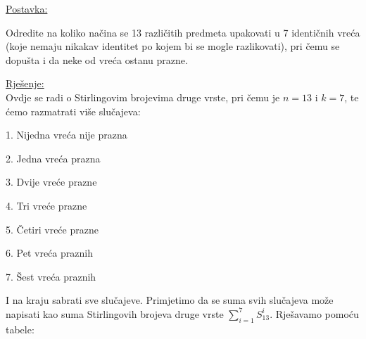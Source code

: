 \documentclass[12pt]{article}
\begin{document}
\underline{Postavka:}

Odredite na koliko načina se 13 različitih predmeta upakovati u 7 identičnih vreća (koje nemaju nikakav identitet po kojem bi se mogle razlikovati), pri čemu se dopušta i da neke od vreća ostanu prazne.

\underline{Rješenje:}\\

Ovdje se radi o Stirlingovim brojevima druge vrste, pri čemu je $n = 13$ i $k = 7$, te ćemo razmatrati više slučajeva:

\begin{center}
1. Nijedna vreća nije prazna

2. Jedna vreća prazna 

3. Dvije vreće prazne

4. Tri vreće prazne

5. Četiri vreće prazne

6. Pet vreća praznih

7. Šest vreća praznih
\end{center}

I na kraju sabrati sve slučajeve. Primjetimo da se suma svih slučajeva može napisati kao suma Stirlingovih brojeva druge vrste $\sum_{i=1}^7 S_{13}^i$. Rješavamo pomoću tabele:
\end{document}
